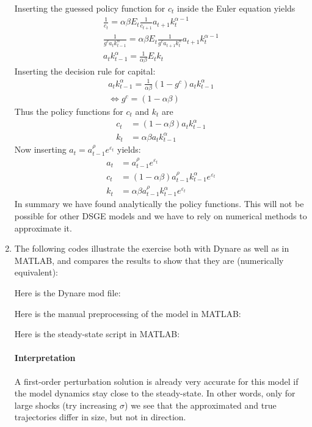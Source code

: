 \begin{enumerate}
Inserting the guessed policy function for $c_t$ inside the Euler equation yields
\begin{align*}
\frac{1}{c_t} = \alpha \beta E_t \frac{1}{c_{t+1}} a_{t+1} k_{t}^{\alpha-1}
\\
\frac{1}{g^c a_t k_{t-1}^\alpha} = \alpha \beta E_t \frac{1}{g^c a_{t+1} k_{t}^\alpha} a_{t+1} k_{t}^{\alpha-1}
\\
a_t k_{t-1}^\alpha = \frac{1}{\alpha \beta} E_t k_{t}
\end{align*}
Inserting the decision rule for capital:
\begin{align*}
a_t k_{t-1}^\alpha = \frac{1}{\alpha \beta} (1-g^c)a_t k_{t-1}^\alpha
\\
\Leftrightarrow g^c = (1-\alpha \beta)
\end{align*}
Thus the policy functions for $c_t$ and $k_t$ are
\begin{align*}
c_t &= (1-\alpha\beta) a_t k_{t-1}^\alpha
\\
k_{t} &= \alpha \beta a_t k_{t-1}^\alpha
\end{align*}
Now inserting $a_t = a_{t-1}^{\rho} e^{\varepsilon_t}$ yields:
\begin{align*}
a_t &= a_{t-1}^{\rho} e^{\varepsilon_t}
\\
c_t &= (1-\alpha\beta) a_{t-1}^\rho k_{t-1}^\alpha e^{\varepsilon_t}
\\
k_t &= \alpha\beta a_{t-1}^\rho k_{t-1}^\alpha e^{\varepsilon_t}
\end{align*}
In summary we have found analytically the policy functions.
This will not be possible for other DSGE models and we have to rely on numerical methods to approximate it.

\item The following codes illustrate the exercise both with Dynare as well as in MATLAB,
  and compares the results to show that they are (numerically equivalent):



Here is the Dynare mod file:


Here is the manual preprocessing of the model in MATLAB:


Here is the steady-state script in MATLAB:


\paragraph{Interpretation} A first-order perturbation solution is already very accurate for this model if the model dynamics stay close to the steady-state.
In other words, only for large shocks (try increasing $\sigma$) we see that the approximated and true trajectories differ in size, but not in direction.

\end{enumerate}